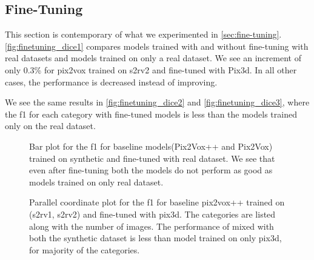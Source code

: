 \subsection{Fine-Tuning}\label{subsec:fine-tuning-dice}

This section is contemporary of what we experimented in \autoref{sec:fine-tuning}.
\autoref{fig:finetuning_dice1} compares models trained with and without fine-tuning with real datasets and models trained on only a real dataset.
We see an increment of only 0.3\% for pix2vox trained on \gls{s2rv2} and fine-tuned with Pix3d.
In all other cases, the performance is decreased instead of improving.

We see the same results in  \autoref{fig:finetuning_dice2} and \autoref{fig:finetuning_dice3},
where the \gls{f1} for each category with fine-tuned models is less than the models trained only on the real dataset.
%


\begin{figure}[ht]
    \centering
    \resizebox{0.75\textwidth}{!}{}
    \caption{Bar plot for the \gls{f1} for baseline models(Pix2Vox++ and Pix2Vox) trained on synthetic and fine-tuned with real dataset.
    We see that even after fine-tuning both the models do not perform as good as models trained on only real dataset.}
    \label{fig:finetuning_dice1}
\end{figure}

\begin{figure}
    \centering
    \resizebox{0.75\textwidth}{!}{}
    \caption{Parallel coordinate plot for the \gls{f1} for baseline pix2vox++ trained on (\gls{s2rv1}, \gls{s2rv2}) and fine-tuned with pix3d.
    The categories are listed along with the number of images.
    The performance of  mixed with both the synthetic dataset is less than model trained on only pix3d, for majority of the categories.}
    \label{fig:finetuning_dice2}
\end{figure}

